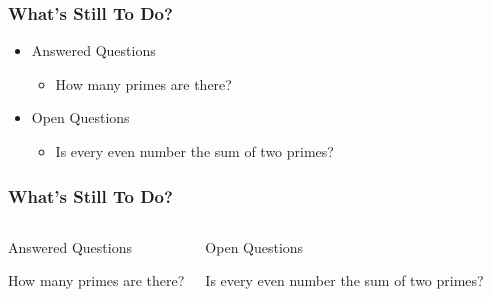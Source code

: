 \begin{frame}
  \frametitle{What's Still To Do?}


  \begin{itemize}

  \item Answered Questions

    \begin{itemize}

    \item How many primes are there?

    \end{itemize}

  \item Open Questions

    \begin{itemize}

    \item Is every even number the sum of two primes?

    \end{itemize}

  \end{itemize}

\end{frame}





\begin{frame}
  \frametitle{What's Still To Do?}


  \begin{columns}

    \begin{block}{Answered Questions}

      How many primes are there?

    \end{block}




    \begin{block}{Open Questions}

      Is every even number the sum of two primes?

    \end{block}

  \end{columns}

\end{frame}






